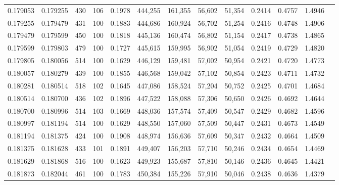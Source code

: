 \begin{tabular}{rrrrrrrrrrrrr}
0.179053 & 0.179255 &   430 & 106 &                                     0.1978 & 444,255 & 161,355 &  56,602 &  51,354 & 0.2414 & 0.4757 & 1.4946 \\
0.179255 & 0.179479 &   431 & 100 &                                     0.1883 & 444,686 & 160,924 &  56,702 &  51,254 & 0.2416 & 0.4748 & 1.4906 \\
0.179479 & 0.179599 &   450 & 100 &                                     0.1818 & 445,136 & 160,474 &  56,802 &  51,154 & 0.2417 & 0.4738 & 1.4865 \\
0.179599 & 0.179803 &   479 & 100 &                                     0.1727 & 445,615 & 159,995 &  56,902 &  51,054 & 0.2419 & 0.4729 & 1.4820 \\
0.179805 & 0.180056 &   514 & 100 &                                     0.1629 & 446,129 & 159,481 &  57,002 &  50,954 & 0.2421 & 0.4720 & 1.4773 \\
0.180057 & 0.180279 &   439 & 100 &                                     0.1855 & 446,568 & 159,042 &  57,102 &  50,854 & 0.2423 & 0.4711 & 1.4732 \\
0.180281 & 0.180514 &   518 & 102 &                                     0.1645 & 447,086 & 158,524 &  57,204 &  50,752 & 0.2425 & 0.4701 & 1.4684 \\
0.180514 & 0.180700 &   436 & 102 &                                     0.1896 & 447,522 & 158,088 &  57,306 &  50,650 & 0.2426 & 0.4692 & 1.4644 \\
0.180700 & 0.180996 &   514 & 103 &                                     0.1669 & 448,036 & 157,574 &  57,409 &  50,547 & 0.2429 & 0.4682 & 1.4596 \\
0.180997 & 0.181194 &   514 & 100 &                                     0.1629 & 448,550 & 157,060 &  57,509 &  50,447 & 0.2431 & 0.4673 & 1.4549 \\
0.181194 & 0.181375 &   424 & 100 &                                     0.1908 & 448,974 & 156,636 &  57,609 &  50,347 & 0.2432 & 0.4664 & 1.4509 \\
0.181375 & 0.181628 &   433 & 101 &                                     0.1891 & 449,407 & 156,203 &  57,710 &  50,246 & 0.2434 & 0.4654 & 1.4469 \\
0.181629 & 0.181868 &   516 & 100 &                                     0.1623 & 449,923 & 155,687 &  57,810 &  50,146 & 0.2436 & 0.4645 & 1.4421 \\
0.181873 & 0.182044 &   461 & 100 &                                     0.1783 & 450,384 & 155,226 &  57,910 &  50,046 & 0.2438 & 0.4636 & 1.4379 \\

\end{tabular}
